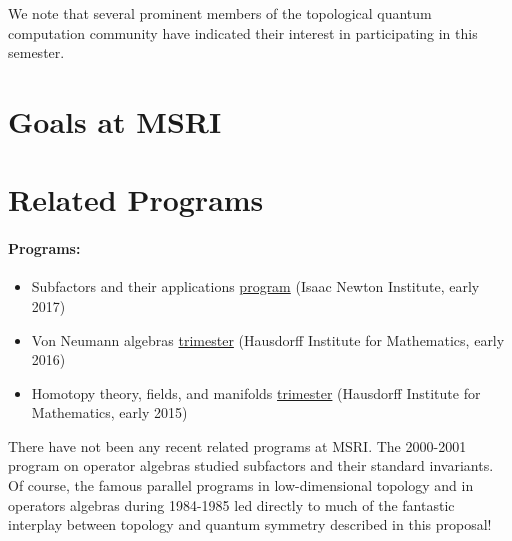 \documentclass[12pt]{article}
\begin{document}
We note that several prominent members of the topological quantum computation community have indicated their interest in participating in this semester.

\section{Goals at MSRI}

\section{Related Programs}

\paragraph{Programs:}
\begin{itemize}
  \setlength{\itemsep}{1pt}
  \setlength{\parskip}{0pt}
  \setlength{\parsep}{0pt}
\item Subfactors and their applications \href{https://www.newton.ac.uk/event/oas}{program} (Isaac Newton Institute, early 2017)
\item Von Neumann algebras \href{https://www.him.uni-bonn.de/programs/future-programs/future-trimester-programs/von-neumann-algebras-2016/description/}{trimester} (Hausdorff Institute for Mathematics, early 2016)
\item Homotopy theory, fields, and manifolds \href{https://www.him.uni-bonn.de/programs/past-programs/past-trimester-programs/homotopy-theory-2015/description/}{trimester} (Hausdorff Institute for Mathematics, early 2015)
\end{itemize}

There have not been any recent related programs at MSRI. The 2000-2001 program on operator algebras studied subfactors and their standard invariants. Of course, the famous parallel programs in low-dimensional topology and in operators algebras during 1984-1985 led directly to much of the fantastic interplay between topology and quantum symmetry described in this proposal!
\end{document}
